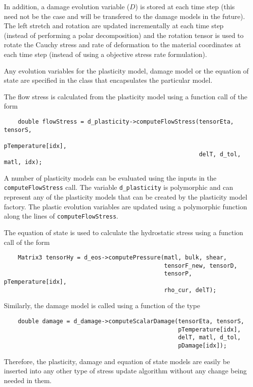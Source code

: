 In addition, a damage evolution variable ($D$) is stored at each time 
step (this need not be the case and will be transfered to the 
damage models in the future).  The left stretch and rotation are 
updated incrementally at each
time step (instead of performing a polar decomposition) and the 
rotation tensor is used to rotate the Cauchy stress and rate of deformation
to the material coordinates at each time step (instead of using a 
objective stress rate formulation).  

Any evolution variables for the plasticity model, damage model or the
equation of state are specified in the class that encapsulates the 
particular model.  

The flow stress is calculated from the plasticity model using a 
function call of the form
\lstset{language=C++}
\begin{lstlisting}
    double flowStress = d_plasticity->computeFlowStress(tensorEta, tensorS, 
                                                        pTemperature[idx],
                                                        delT, d_tol, matl, idx);
\end{lstlisting}
A number of plasticity models can be evaluated using the inputs in the
\verb+computeFlowStress+ call.  The variable \verb+d_plasticity+ is
polymorphic and can represent any of the plasticity models that can be
created by the plasticity model factory.  The plastic evolution variables
are updated using a polymorphic function along the lines of
\verb+computeFlowStress+.

The equation of state is used to calculate the hydrostatic stress using
a function call of the form
\lstset{language=C++}
\begin{lstlisting}
    Matrix3 tensorHy = d_eos->computePressure(matl, bulk, shear, 
                                              tensorF_new, tensorD, 
                                              tensorP, pTemperature[idx], 
                                              rho_cur, delT);
\end{lstlisting}

Similarly, the damage model is called using a function of the type
\lstset{language=C++}
\begin{lstlisting}
    double damage = d_damage->computeScalarDamage(tensorEta, tensorS, 
                                                  pTemperature[idx],
                                                  delT, matl, d_tol, 
                                                  pDamage[idx]);
\end{lstlisting}

Therefore, the plasticity, damage and equation of state models are 
easily be inserted into any other type of stress update algorithm 
without any change being needed in them.

